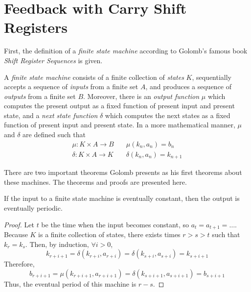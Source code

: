 \section{Feedback with Carry Shift Registers}
\par First, the definition of a {\em finite state machine}
according to Golomb's famous book {\em Shift Register Sequences}
is given.

\begin{definition}\label{finite-state-machine}
  A {\em finite state machine} consists of a finite collection of {\em states}
  $K$, sequentially accepts a sequence of {\em inputs} from a finite set
  $A$, and produces a sequence of {\em outputs} from a finite set
  $B$. Moreover, there is an {\em output function} $\mu$ which computes
  the present output as a fixed function of present input and present state, and a
  {\em next state function} $\delta$ which computes the next states as a fixed
  function of present input and present state. In a more mathematical manner,
  $\mu$ and $\delta$ are defined such that
  \begin{eqnarray}
    \mu:K \times A \rightarrow B \quad &\mu(k_n,a_n)=b_n \\
    \delta:K \times A \rightarrow K \quad &\delta(k_n,a_n)=k_{n+1}
  \end{eqnarray}
\end{definition}

\par There are two important theorems Golomb presents as his first theorems about
these machines. The theorems and proofs are presented here.

\begin{theorem}\label{thm:golomb-1}
  If the input to a finite state machine is eventually constant, then the output
  is eventually periodic.
\end{theorem}
\begin{proof}
  Let $t$ be the time when the input becomes constant, so $a_t=a_{t+1}=\dots$.
  Because $K$ is a finite collection of states, there exists times $r>s>t$ such
  that $k_r=k_s$. Then, by induction, $\forall i>0$,
  \[
  k_{r+i+1}=\delta(k_{r+i},a_{r+i})=\delta(k_{s+i},a_{s+i})=k_{s+i+1}
  \]
  Therefore,
  \[
  b_{r+i+1}=\mu(k_{r+i+1},a_{r+i+1})=\delta(k_{s+i+1},a_{s+i+1})=b_{s+i+1}
  \]
  Thus, the eventual period of this machine is $r-s$.
\end{proof}

